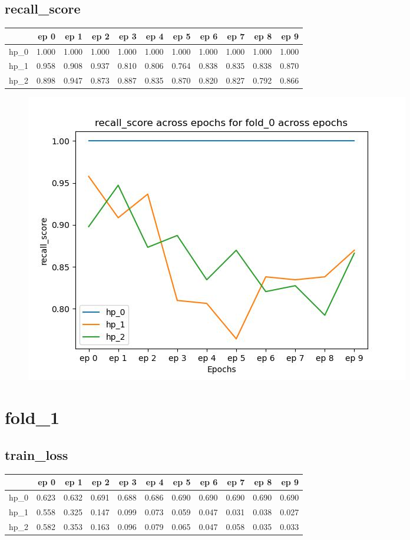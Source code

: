 \documentclass{article}
\begin{document}
\subsection{recall\_score}
\begin{tabular}{lrrrrrrrrrr}
\toprule
{} &   ep 0 &   ep 1 &   ep 2 &   ep 3 &   ep 4 &   ep 5 &   ep 6 &   ep 7 &   ep 8 &   ep 9 \\
\midrule
hp\_0 &  1.000 &  1.000 &  1.000 &  1.000 &  1.000 &  1.000 &  1.000 &  1.000 &  1.000 &  1.000 \\
hp\_1 &  0.958 &  0.908 &  0.937 &  0.810 &  0.806 &  0.764 &  0.838 &  0.835 &  0.838 &  0.870 \\
hp\_2 &  0.898 &  0.947 &  0.873 &  0.887 &  0.835 &  0.870 &  0.820 &  0.827 &  0.792 &  0.866 \\
\bottomrule
\end{tabular}

\begin{figure}[H]
\includegraphics[scale = 0.75]{fold_0/recall_score}
\end{figure}
\section{fold\_1}
\subsection{train\_loss}
\begin{tabular}{lrrrrrrrrrr}
\toprule
{} &   ep 0 &   ep 1 &   ep 2 &   ep 3 &   ep 4 &   ep 5 &   ep 6 &   ep 7 &   ep 8 &   ep 9 \\
\midrule
hp\_0 &  0.623 &  0.632 &  0.691 &  0.688 &  0.686 &  0.690 &  0.690 &  0.690 &  0.690 &  0.690 \\
hp\_1 &  0.558 &  0.325 &  0.147 &  0.099 &  0.073 &  0.059 &  0.047 &  0.031 &  0.038 &  0.027 \\
hp\_2 &  0.582 &  0.353 &  0.163 &  0.096 &  0.079 &  0.065 &  0.047 &  0.058 &  0.035 &  0.033 \\
\bottomrule
\end{tabular}
\end{document}
